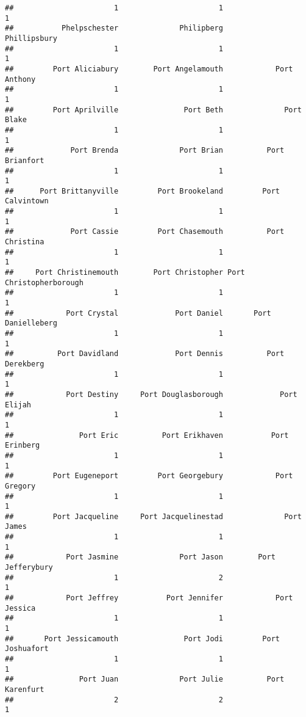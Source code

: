 \documentclass[
]{article}
\begin{document}
\begin{verbatim}
##                       1                       1                       1 
##           Phelpschester              Philipberg            Phillipsbury 
##                       1                       1                       1 
##         Port Aliciabury        Port Angelamouth            Port Anthony 
##                       1                       1                       1 
##         Port Aprilville               Port Beth              Port Blake 
##                       1                       1                       1 
##             Port Brenda              Port Brian          Port Brianfort 
##                       1                       1                       1 
##      Port Brittanyville         Port Brookeland         Port Calvintown 
##                       1                       1                       1 
##             Port Cassie         Port Chasemouth          Port Christina 
##                       1                       1                       1 
##     Port Christinemouth        Port Christopher Port Christopherborough 
##                       1                       1                       1 
##            Port Crystal             Port Daniel       Port Danielleberg 
##                       1                       1                       1 
##          Port Davidland             Port Dennis          Port Derekberg 
##                       1                       1                       1 
##            Port Destiny     Port Douglasborough             Port Elijah 
##                       1                       1                       1 
##               Port Eric          Port Erikhaven           Port Erinberg 
##                       1                       1                       1 
##         Port Eugeneport         Port Georgebury            Port Gregory 
##                       1                       1                       1 
##         Port Jacqueline     Port Jacquelinestad              Port James 
##                       1                       1                       1 
##            Port Jasmine              Port Jason        Port Jefferybury 
##                       1                       2                       1 
##            Port Jeffrey           Port Jennifer            Port Jessica 
##                       1                       1                       1 
##       Port Jessicamouth               Port Jodi         Port Joshuafort 
##                       1                       1                       1 
##               Port Juan              Port Julie          Port Karenfurt 
##                       2                       2                       1 

\end{verbatim}
\end{document}
